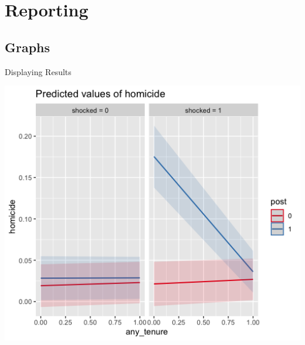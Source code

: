 \documentclass{beamer}
\begin{document}
\section{Reporting} 
\subsection{Graphs} 
\begin{frame}{Displaying Results}
\begin{center}
\includegraphics[width=.6\textwidth]{interaction_anytenure.png} 
\end{center} 
\end{frame} 
\end{document}
